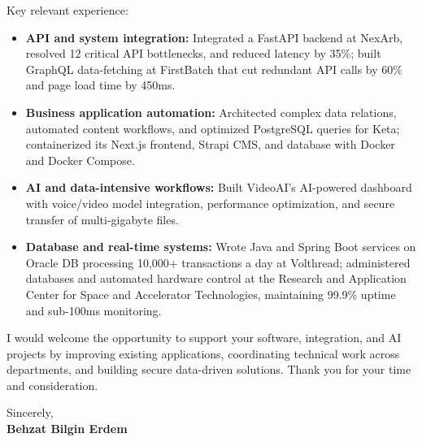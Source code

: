 \documentclass[a4paper,11pt]{article}
\begin{document}
Key relevant experience:
\begin{itemize}[leftmargin=*,itemsep=3pt,topsep=4pt]
  \item \textbf{API and system integration:} Integrated a FastAPI backend at NexArb, resolved 12 critical API bottlenecks, and reduced latency by 35\%; built GraphQL data-fetching at FirstBatch that cut redundant API calls by 60\% and page load time by 450ms.
  \item \textbf{Business application automation:} Architected complex data relations, automated content workflows, and optimized PostgreSQL queries for Keta; containerized its Next.js frontend, Strapi CMS, and database with Docker and Docker Compose.
  \item \textbf{AI and data-intensive workflows:} Built VideoAI's AI-powered dashboard with voice/video model integration, performance optimization, and secure transfer of multi-gigabyte files.
  \item \textbf{Database and real-time systems:} Wrote Java and Spring Boot services on Oracle DB processing 10,000+ transactions a day at Volthread; administered databases and automated hardware control at the Research and Application Center for Space and Accelerator Technologies, maintaining 99.9\% uptime and sub-100ms monitoring.
\end{itemize}

I would welcome the opportunity to support your software, integration, and AI projects by improving existing applications, coordinating technical work across departments, and building secure data-driven solutions. Thank you for your time and consideration.

\vspace{16pt}

\noindent Sincerely,\\[6pt]
\textbf{Behzat Bilgin Erdem}
\end{document}

